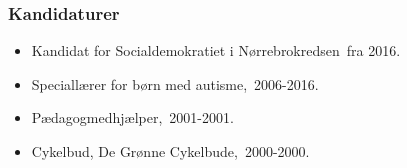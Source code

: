 \documentclass[11pt, a4paper]{awesome-cv}
\begin{document}
\begin{cvletter}
\subsubsection*{Kandidaturer}
\begin{itemize}
\item Kandidat for Socialdemokratiet i Nørrebrokredsen fra 2016.
\end{itemize}
\begin{itemize}
\item Speciallærer for børn med autisme, 2006-2016.
\item Pædagogmedhjælper, 2001-2001.
\item Cykelbud, De Grønne Cykelbude, 2000-2000.
\end{itemize}
\end{cvletter}
\end{document}
